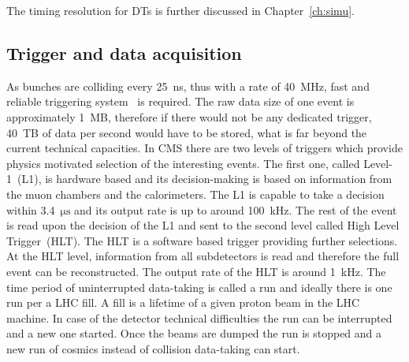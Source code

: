 \begin{description}
The timing resolution for DTs is further discussed in Chapter~\ref{ch:simu}.


\end{description}

\subsection{Trigger and data acquisition}

As bunches are colliding every 25~ns, thus with a rate of 40~MHz, fast and reliable triggering system~\cite{Khachatryan:2016bia} is required. The raw data size of one event is approximately 1~MB, therefore if there would not be any dedicated trigger, 40~TB of data per second would have to be stored, what is far beyond the current technical capacities. In CMS there are two levels of triggers which provide physics motivated selection of the interesting events. The first one, called Level-1~(L1), is hardware based and its decision-making is based on information from the muon chambers and the calorimeters. The L1 is capable to take a decision within 3.4~$\mathrm{\mu s}$ and its output rate is up to around 100~kHz. The rest of the event is read upon the decision of the L1 and sent to the second level called High Level Trigger~(HLT). The HLT is a software based trigger providing further selections. At the HLT level, information from all subdetectors is read and therefore the full event can be reconstructed. The output rate of the HLT is around 1~kHz. The time period of uninterrupted data-taking is called a run and ideally there is one run per a LHC fill. A fill is a lifetime of a given proton beam in the LHC machine. In case of the detector technical difficulties the run can be interrupted and a new one started. Once the beams are dumped the run is stopped and a new run of cosmics instead of collision data-taking can start.

